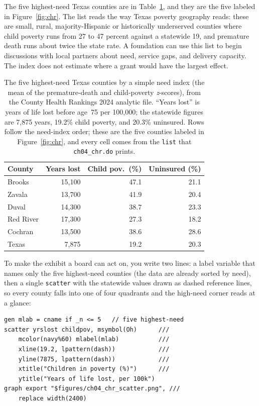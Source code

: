 The five highest-need Texas counties are in Table~\ref{tab:chr}, and they are the five labeled in Figure~\ref{fig:chr}. The list reads the way Texas poverty geography reads: these are small, rural, majority-Hispanic or historically underserved counties where child poverty runs from 27 to 47 percent against a statewide 19, and premature death runs about twice the state rate. A foundation can use this list to begin discussions with local partners about need, service gaps, and delivery capacity. The index does not estimate where a grant would have the largest effect.

\begin{table}[htbp]
\centering
\caption[Five highest-need Texas counties]{The five highest-need Texas counties by a simple need index (the mean of the premature-death and child-poverty \emph{z}-scores), from the County Health Rankings 2024 analytic file. \enquote{Years lost} is years of life lost before age~75 per 100{,}000; the statewide figures are 7{,}875 years, 19.2\% child poverty, and 20.3\% uninsured. Rows follow the need-index order; these are the five counties labeled in Figure~\ref{fig:chr}, and every cell comes from the \texttt{list} that \texttt{ch04\_chr.do} prints.}
\label{tab:chr}
\begin{tabular}{lrrr}
\hline
County & Years lost & Child pov.\ (\%) & Uninsured (\%) \\
\hline
Brooks    & 15{,}100 & 47.1 & 21.1 \\
Zavala    & 13{,}700 & 41.9 & 20.4 \\
Duval     & 14{,}300 & 38.7 & 23.3 \\
Red River & 17{,}300 & 27.3 & 18.2 \\
Cochran   & 13{,}500 & 38.6 & 28.6 \\
\hline
Texas     &  7{,}875 & 19.2 & 20.3 \\
\hline
\end{tabular}
\end{table}

To make the exhibit a board can act on, you write two lines: a label variable that names only the five highest-need counties (the data are already sorted by need), then a single \texttt{scatter} with the statewide values drawn as dashed reference lines, so every county falls into one of four quadrants and the high-need corner reads at a glance:
\par
{\footnotesize
\begin{verbatim}
gen mlab = cname if _n <= 5   // five highest-need
scatter yrslost childpov, msymbol(Oh)      ///
    mcolor(navy%60) mlabel(mlab)           ///
    xline(19.2, lpattern(dash))            ///
    yline(7875, lpattern(dash))            ///
    xtitle("Children in poverty (%)")      ///
    ytitle("Years of life lost, per 100k")
graph export "$figures/ch04_chr_scatter.png", ///
    replace width(2400)
\end{verbatim}
}

